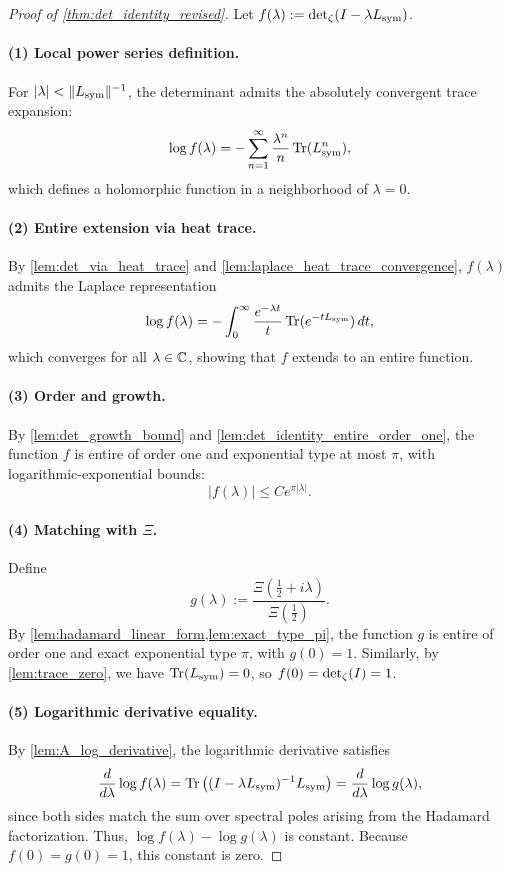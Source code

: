 \begin{proof}[Proof of \cref{thm:det_identity_revised}]
Let \( f(\lambda) := \det\nolimits_{\zeta}(I - \lambda L_{\mathrm{sym}}) \).

\paragraph{(1) Local power series definition.}
For \( |\lambda| < \|L_{\mathrm{sym}}\|^{-1} \), the determinant admits the absolutely convergent trace expansion:
\[
\log f(\lambda) = - \sum_{n=1}^\infty \frac{\lambda^n}{n} \operatorname{Tr}(L_{\mathrm{sym}}^n),
\]
which defines a holomorphic function in a neighborhood of \( \lambda = 0 \).

\paragraph{(2) Entire extension via heat trace.}
By \cref{lem:det_via_heat_trace} and \cref{lem:laplace_heat_trace_convergence}, \( f(\lambda) \) admits the Laplace representation
\[
\log f(\lambda) = - \int_0^\infty \frac{e^{-\lambda t}}{t} \operatorname{Tr}(e^{-t L_{\mathrm{sym}}}) \, dt,
\]
which converges for all \( \lambda \in \mathbb{C} \), showing that \( f \) extends to an entire function.

\paragraph{(3) Order and growth.}
By \cref{lem:det_growth_bound} and \cref{lem:det_identity_entire_order_one}, the function \( f \) is entire of order one and exponential type at most \( \pi \), with logarithmic-exponential bounds:
\[
|f(\lambda)| \le C e^{\pi |\lambda|}.
\]

\paragraph{(4) Matching with \(\Xi\).}
Define
\[
g(\lambda) := \frac{\Xi\left( \tfrac{1}{2} + i\lambda \right)}{\Xi\left( \tfrac{1}{2} \right)}.
\]
By \cref{lem:hadamard_linear_form,lem:exact_type_pi}, the function \( g \) is entire of order one and exact exponential type \( \pi \), with \( g(0) = 1 \). Similarly, by \cref{lem:trace_zero}, we have \( \operatorname{Tr}(L_{\mathrm{sym}}) = 0 \), so \( f(0) = \det\nolimits_{\zeta}(I) = 1 \).

\paragraph{(5) Logarithmic derivative equality.}
By \cref{lem:A_log_derivative}, the logarithmic derivative satisfies
\[
\frac{d}{d\lambda} \log f(\lambda)
= \operatorname{Tr}\left( (I - \lambda L_{\mathrm{sym}})^{-1} L_{\mathrm{sym}} \right)
= \frac{d}{d\lambda} \log g(\lambda),
\]
since both sides match the sum over spectral poles arising from the Hadamard factorization. Thus, \( \log f(\lambda) - \log g(\lambda) \) is constant. Because \( f(0) = g(0) = 1 \), this constant is zero.


\end{proof}
